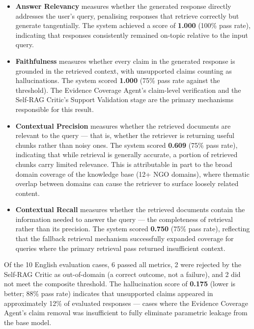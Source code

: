 \begin{itemize}
    \item \textbf{Answer Relevancy} measures whether the generated response 
    directly addresses the user's query, penalising responses that retrieve 
    correctly but generate tangentially. The system achieved a score of 
    \textbf{1.000} (100\% pass rate), indicating that responses consistently 
    remained on-topic relative to the input query.

    \item \textbf{Faithfulness} measures whether every claim in the generated 
    response is grounded in the retrieved context, with unsupported claims 
    counting as hallucinations. The system scored \textbf{1.000} (75\% pass 
    rate against the threshold). The Evidence Coverage Agent's claim-level 
    verification and the Self-RAG Critic's Support Validation stage are the 
    primary mechanisms responsible for this result.

    \item \textbf{Contextual Precision} measures whether the retrieved documents 
    are relevant to the query — that is, whether the retriever is returning 
    useful chunks rather than noisy ones. The system scored \textbf{0.609} (75\% 
    pass rate), indicating that while retrieval is generally accurate, a portion 
    of retrieved chunks carry limited relevance. This is attributable in part to 
    the broad domain coverage of the knowledge base (12+ NGO domains), where 
    thematic overlap between domains can cause the retriever to surface loosely 
    related content.

    \item \textbf{Contextual Recall} measures whether the retrieved documents 
    contain the information needed to answer the query — the completeness of 
    retrieval rather than its precision. The system scored \textbf{0.750} (75\% 
    pass rate), reflecting that the fallback retrieval mechanism successfully 
    expanded coverage for queries where the primary retrieval pass returned 
    insufficient context.
\end{itemize}

Of the 10 English evaluation cases, 6 passed all metrics, 2 were rejected by 
the Self-RAG Critic as out-of-domain (a correct outcome, not a failure), and 2 
did not meet the composite threshold. The hallucination score of \textbf{0.175} 
(lower is better; 88\% pass rate) indicates that unsupported claims appeared in 
approximately 12\% of evaluated responses — cases where the Evidence Coverage 
Agent's claim removal was insufficient to fully eliminate parametric leakage 
from the base model.

